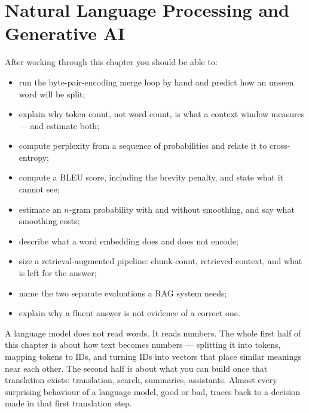 
\chapter{Natural Language Processing and Generative AI}


\label{ch:nlp-voice-assistants}

\begin{learningobjectives}
After working through this chapter you should be able to:
\begin{itemize}
  \item run the byte-pair-encoding merge loop by hand and predict how an unseen
        word will be split;
  \item explain why token count, not word count, is what a context window
        measures --- and estimate both;
  \item compute perplexity from a sequence of probabilities and relate it to
        cross-entropy;
  \item compute a BLEU score, including the brevity penalty, and state what it
        cannot see;
  \item estimate an $n$-gram probability with and without smoothing, and say
        what smoothing costs;
  \item describe what a word embedding does and does not encode;
  \item size a retrieval-augmented pipeline: chunk count, retrieved context,
        and what is left for the answer;
  \item name the two separate evaluations a RAG system needs;
  \item explain why a fluent answer is not evidence of a correct one.
\end{itemize}
\end{learningobjectives}

\begin{plainlanguage}
A language model does not read words. It reads numbers. The whole first half of
this chapter is about how text becomes numbers --- splitting it into tokens,
mapping tokens to IDs, and turning IDs into vectors that place similar meanings
near each other. The second half is about what you can build once that
translation exists: translation, search, summaries, assistants. Almost every
surprising behaviour of a language model, good or bad, traces back to a
decision made in that first translation step.
\end{plainlanguage}

